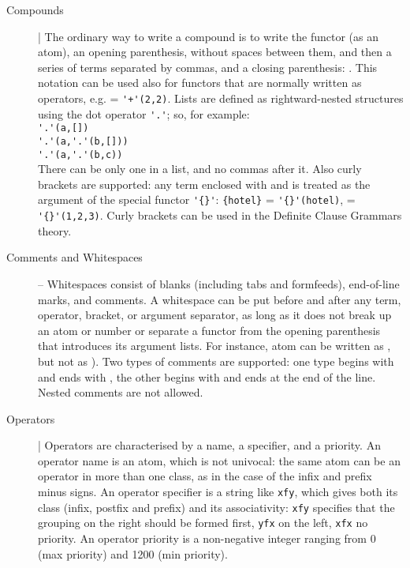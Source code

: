 \begin{description}
\item[Compounds] |
The ordinary way to write a compound is to write the functor (as an atom), an opening parenthesis, without spaces between them, and then a series of terms separated by commas, and a closing parenthesis: .
%
This notation can be used also for functors that are normally written as operators, e.g.  = \verb|'+'(2,2)|.
%
Lists are defined as rightward-nested structures using the dot operator \verb|'.'|; so, for example: \\
\bt{[a] =} \verb|'.'(a,[])|\\
\bt{[a,b] =} \verb|'.'(a,'.'(b,[]))|\\
\bt{[a,b|c] =} \verb|'.'(a,'.'(b,c))|\\
%
There can be only one \bt{|} in a list, and no commas after it.
%
Also curly brackets are supported: any term enclosed with \bt{$\{$} and \bt{$\}$} is treated as the argument of the special functor \verb|'{}'|:  \verb|{hotel}| = \verb|'{}'(hotel)|,  = \verb|'{}'(1,2,3)|.
%
Curly brackets can be used in the Definite Clause Grammars theory.


\item[Comments and Whitespaces] -- Whitespaces consist of blanks (including tabs and formfeeds), end-of-line marks, and comments. A whitespace can be put before and after any term, operator, bracket, or argument separator, as long as it does not break up an atom or number or separate a functor from the opening parenthesis that introduces its argument lists.
%
For instance, atom  can be written as , but not as ).
%
Two types of comments are supported: one type begins with \bt{/*} and ends with \bt{*/}, the other begins with \bt{\%} and ends at the end of the line.
%
Nested comments are not allowed.


\item[Operators] |
Operators are characterised by a name, a specifier, and a priority.
%
An operator name is an atom, which is not univocal: the same atom can be an operator in more than one class, as in the case of the infix and prefix minus signs.
%
An operator  specifier is a string like \texttt{xfy}, which gives both its class (infix, postfix and prefix) and its associativity: \texttt{xfy} specifies that the grouping on the right should be formed first, \texttt{yfx} on the left, \texttt{xfx} no priority.
%
An operator priority is a non-negative integer ranging from 0 (max priority) and 1200 (min priority).


\end{description}
